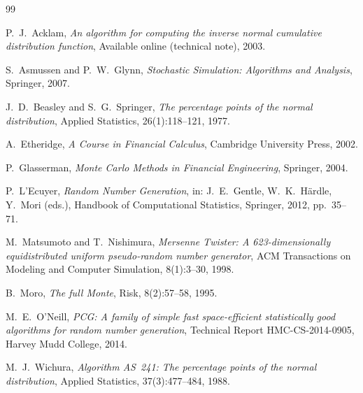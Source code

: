 \documentclass[11pt,a4paper]{article}
\theoremstyle{plain}
\theoremstyle{definition}
\theoremstyle{remark}
\begin{document}
\begin{thebibliography}{99}

P.\ J.\ Acklam,
\emph{An algorithm for computing the inverse normal cumulative
distribution function},
Available online (technical note), 2003.

S.\ Asmussen and P.\ W.\ Glynn,
\emph{Stochastic Simulation: Algorithms and Analysis},
Springer, 2007.

J.\ D.\ Beasley and S.\ G.\ Springer,
\emph{The percentage points of the normal distribution},
Applied Statistics, 26(1):118--121, 1977.

A.\ Etheridge,
\emph{A Course in Financial Calculus},
Cambridge University Press, 2002.

P.\ Glasserman,
\emph{Monte Carlo Methods in Financial Engineering},
Springer, 2004.

P.\ L'Ecuyer,
\emph{Random Number Generation},
in: J.\ E.\ Gentle, W.\ K.\ H\"ardle, Y.\ Mori (eds.),
Handbook of Computational Statistics, Springer, 2012, pp.\ 35--71.

M.\ Matsumoto and T.\ Nishimura,
\emph{Mersenne Twister: A 623-dimensionally equidistributed uniform
pseudo-random number generator},
ACM Transactions on Modeling and Computer Simulation, 8(1):3--30, 1998.

B.\ Moro,
\emph{The full Monte},
Risk, 8(2):57--58, 1995.

M.\ E.\ O'Neill,
\emph{PCG: A family of simple fast space-efficient statistically good
algorithms for random number generation},
Technical Report HMC-CS-2014-0905, Harvey Mudd College, 2014.

M.\ J.\ Wichura,
\emph{Algorithm AS~241: The percentage points of the normal
distribution},
Applied Statistics, 37(3):477--484, 1988.

\end{thebibliography}
\end{document}
